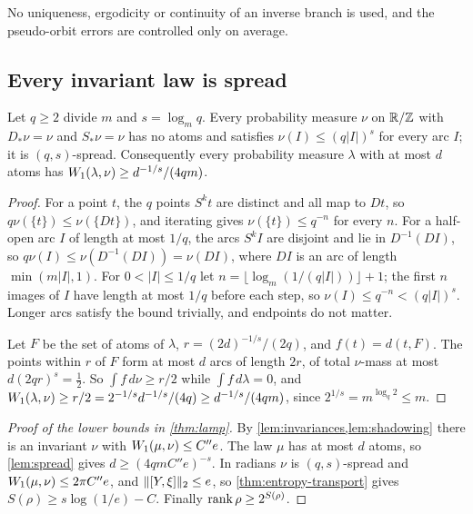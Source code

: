 No uniqueness, ergodicity or continuity of an inverse branch is used, and the pseudo-orbit errors are controlled only on
average.

\subsection{Every invariant law is spread}\label{sec:rates-spread}

\begin{lemma}[Spread]\label{lem:spread}
Let $q\ge2$ divide $m$ and $s=\log_mq$. Every probability measure $\nu$ on $\mathbb R/\mathbb Z$ with $D_*\nu=\nu$ and $S_*\nu=\nu$ has no
atoms and satisfies $\nu(I)\le(q|I|)^s$ for every arc $I$; it is $(q,s)$-spread. Consequently every probability measure
$\lambda$ with at most $d$ atoms has $W_1(\lambda,\nu)\ge d^{-1/s}/(4qm)$.
\end{lemma}

\begin{proof}
For a point $t$, the $q$ points $S^kt$ are distinct and all map to $Dt$, so $q\nu(\{t\})\le\nu(\{Dt\})$, and iterating gives
$\nu(\{t\})\le q^{-n}$ for every $n$. For a half-open arc $I$ of length at most $1/q$, the arcs $S^kI$ are disjoint and lie in
$D^{-1}(DI)$, so $q\nu(I)\le\nu(D^{-1}(DI))=\nu(DI)$, where $DI$ is an arc of length $\min(m|I|,1)$. For $0<|I|\le1/q$ let
$n=\lfloor\log_m(1/(q|I|))\rfloor+1$; the first $n$ images of $I$ have length at most $1/q$ before each step, so
$\nu(I)\le q^{-n}<(q|I|)^s$. Longer arcs satisfy the bound trivially, and endpoints do not matter.

Let $F$ be the set of atoms of $\lambda$, $r=(2d)^{-1/s}/(2q)$, and $f(t)=d(t,F)$. The points within $r$ of $F$ form at most
$d$ arcs of length $2r$, of total $\nu$-mass at most $d(2qr)^s=\frac12$. So $\int f\,d\nu\ge r/2$ while $\int f\,d\lambda=0$,
and $W_1(\lambda,\nu)\ge r/2=2^{-1/s}d^{-1/s}/(4q)\ge d^{-1/s}/(4qm)$, since $2^{1/s}=m^{\log_q2}\le m$.
\end{proof}

\begin{proof}[Proof of the lower bounds in \cref{thm:lamp}]
By \cref{lem:invariances,lem:shadowing} there is an invariant $\nu$ with $W_1(\mu,\nu)\le C''e$. The law $\mu$ has at most
$d$ atoms, so \cref{lem:spread} gives $d\ge(4qmC''e)^{-s}$. In radians $\nu$ is $(q,s)$-spread and $W_1(\mu,\nu)\le2\pi C''e$,
and $\lVert [Y,\xi]\rVert_2\le e$, so \cref{thm:entropy-transport} gives $S(\rho)\ge s\log(1/e)-C$. Finally $\operatorname{rank}\rho\ge2^{S(\rho)}$.
\end{proof}

